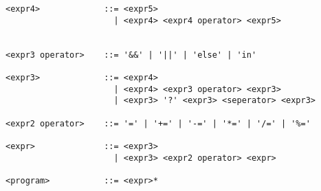\begin{verbatim}
<expr4>             ::= <expr5>
                      | <expr4> <expr4 operator> <expr5>


<expr3 operator>    ::= '&&' | '||' | 'else' | 'in' 

<expr3>             ::= <expr4>
                      | <expr4> <expr3 operator> <expr3>
                      | <expr3> '?' <expr3> <seperator> <expr3>

<expr2 operator>    ::= '=' | '+=' | '-=' | '*=' | '/=' | '%='

<expr>              ::= <expr3>
                      | <expr3> <expr2 operator> <expr>

<program>           ::= <expr>*

\end{verbatim}
